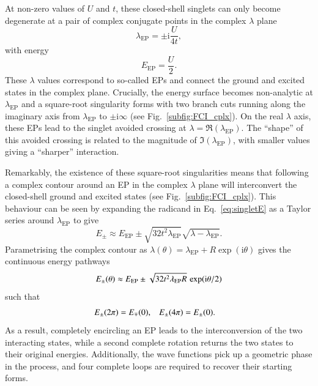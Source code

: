 \documentclass[aps,prb,reprint,noshowkeys,superscriptaddress]{revtex4-1}
\renewcommand{\i}{\mathrm{i}} %
\begin{document}
At non-zero values of $U$ and $t$, these closed-shell singlets can only become degenerate at a pair of complex conjugate points in the complex $\lambda$ plane 
\begin{equation}
\lambda_{\text{EP}} = \pm  \i \frac{U}{4t},
\end{equation}
with energy
\begin{equation}
\label{eq:E_EP}
	E_\text{EP} = \frac{U}{2}.
\end{equation}
These $\lambda$ values correspond to so-called EPs and connect the ground and excited states in the complex plane.
Crucially, the energy surface becomes non-analytic at $\lambda_{\text{EP}}$ and a square-root singularity forms with two branch cuts running along the imaginary axis from $\lambda_{\text{EP}}$  to $\pm \i \infty$ (see Fig.~\ref{subfig:FCI_cplx}).
On the real $\lambda$ axis, these EPs lead to the singlet avoided crossing at $\lambda = \Re(\lambda_{\text{EP}})$.
The ``shape'' of this avoided crossing is related to the magnitude of $\Im(\lambda_{\text{EP}})$, with smaller values giving a ``sharper'' interaction.

Remarkably, the existence of these square-root singularities means that following a complex contour around an EP in the complex $\lambda$ plane will interconvert the closed-shell ground and excited states (see Fig.~\ref{subfig:FCI_cplx}).
This behaviour can be seen by expanding the radicand in Eq.~\eqref{eq:singletE} as a Taylor series around $\lambda_{\text{EP}}$ to give
\begin{equation}
E_{\pm} \approx E_{\text{EP}} \pm \sqrt{32t^2 \lambda_{\text{EP}}} \sqrt{\lambda - \lambda_{\text{EP}}}.
\end{equation}
Parametrising the complex contour as $\lambda(\theta) = \lambda_{\text{EP}} + R \exp(\i \theta)$ gives the continuous energy pathways 
\begin{equation}
E_{\pm} \qty(\theta) \approx E_{\text{EP}} \pm \sqrt{32t^2 \lambda_{\text{EP}} R}\, \exp(\i \theta/2)
\end{equation}
such that
\begin{align}
	E_{\pm}(2\pi) & = E_{\mp}(0),
	&
	E_{\pm}(4\pi) & = E_{\pm}(0). \notag
\end{align}
As a result, completely encircling an EP leads to the interconversion of the two interacting states, while a second complete rotation returns the two states to their original energies.
Additionally, the wave functions pick up a geometric phase in the process, and four complete loops are required to recover their starting forms.\cite{MoiseyevBook}
\end{document}
